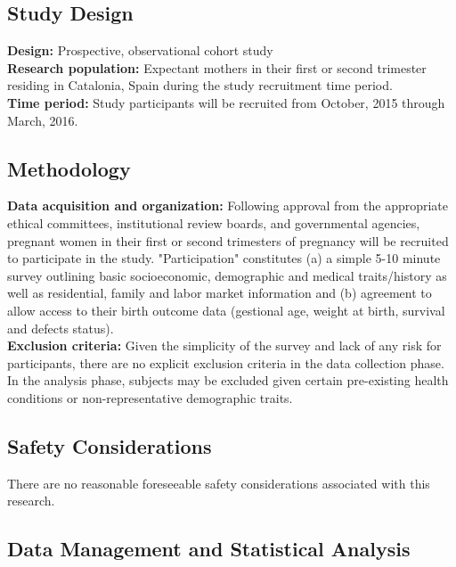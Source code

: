 \documentclass{article}
\begin{document}
\begin{multicols}{2}
\subsection*{Study Design}
\noindent \textbf{Design:} Prospective, observational cohort study \\

\noindent \textbf{Research population:} Expectant mothers in their first or second trimester residing in Catalonia, Spain during the study recruitment time period. \\

\noindent \textbf{Time period:} Study participants will be recruited from October, 2015 through March, 2016.  

\vfill
\columnbreak

\newpage
\subsection*{Methodology}

\noindent \textbf{Data acquisition and organization:} Following approval from the appropriate ethical committees, institutional review boards, and governmental agencies, pregnant women in their first or second trimesters of pregnancy will be recruited to participate in the study.  "Participation" constitutes (a) a simple 5-10 minute survey outlining basic socioeconomic, demographic and medical traits/history as well as residential, family and labor market information and (b) agreement to allow access to their birth outcome data (gestional age, weight at birth, survival and defects status). \\

\noindent \textbf{Exclusion criteria:} Given the simplicity of the survey and lack of any risk for participants, there are no explicit exclusion criteria in the data collection phase.  In the analysis phase, subjects may be excluded given certain pre-existing health conditions or non-representative demographic traits.   \\

\subsection*{Safety Considerations}

There are no reasonable foreseeable safety considerations associated with this research.  


\subsection*{Data Management and Statistical Analysis}


\end{multicols}
\end{document}
